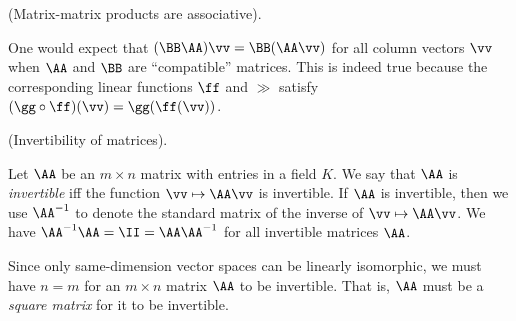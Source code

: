 \begin{remark}
    (Matrix-matrix products are associative).
    
    One would expect that $(\BB \AA) \vv = \BB (\AA \vv)$ for all column vectors $\vv$ when $\AA$ and $\BB$ are ``compatible'' matrices. This is indeed true because the corresponding linear functions $\ff$ and $\gg$ satisfy $(\gg \circ \ff)(\vv) = \gg(\ff(\vv))$.
\end{remark}

\begin{defn}
    (Invertibility of matrices).
    
    Let $\AA$ be an $m \times n$ matrix with entries in a field $K$. We say that $\AA$ is \textit{invertible} iff the function $\vv \mapsto \AA \vv$ is invertible. If $\AA$ is invertible, then we use $\AA^{-1}$ to denote the standard matrix of the inverse of $\vv \mapsto \AA \vv$. We have $\AA^{-1} \AA = \II = \AA \AA^{-1}$ for all invertible matrices $\AA$.

    Since only same-dimension vector spaces can be linearly isomorphic, we must have $n = m$ for an $m \times n$ matrix $\AA$ to be invertible. That is, $\AA$ must be a \textit{square matrix} for it to be invertible.
\end{defn}

